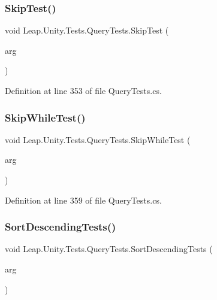 \subsubsection{\texorpdfstring{SkipTest()}{SkipTest()}}
{\footnotesize\ttfamily void Leap.\+Unity.\+Tests.\+Query\+Tests.\+Skip\+Test (\begin{DoxyParamCaption}\item[{\mbox{[}\+Value\+Source(\char`\"{}list0\char`\"{})\mbox{]} \mbox{\hyperlink{class_leap_1_1_unity_1_1_tests_1_1_query_tests_1_1_query_arg}{Query\+Arg}}}]{arg }\end{DoxyParamCaption})}



Definition at line 353 of file Query\+Tests.\+cs.

\mbox{\label{class_leap_1_1_unity_1_1_tests_1_1_query_tests_a1004cfd5e1d18bb4ff27c370eae01ec8}} 
\subsubsection{\texorpdfstring{SkipWhileTest()}{SkipWhileTest()}}
{\footnotesize\ttfamily void Leap.\+Unity.\+Tests.\+Query\+Tests.\+Skip\+While\+Test (\begin{DoxyParamCaption}\item[{\mbox{[}\+Value\+Source(\char`\"{}list0\char`\"{})\mbox{]} \mbox{\hyperlink{class_leap_1_1_unity_1_1_tests_1_1_query_tests_1_1_query_arg}{Query\+Arg}}}]{arg }\end{DoxyParamCaption})}



Definition at line 359 of file Query\+Tests.\+cs.

\mbox{\label{class_leap_1_1_unity_1_1_tests_1_1_query_tests_a4aee7357957aabbb0585cafeff7df189}} 
\subsubsection{\texorpdfstring{SortDescendingTests()}{SortDescendingTests()}}
{\footnotesize\ttfamily void Leap.\+Unity.\+Tests.\+Query\+Tests.\+Sort\+Descending\+Tests (\begin{DoxyParamCaption}\item[{\mbox{[}\+Value\+Source(\char`\"{}list0\char`\"{})\mbox{]} \mbox{\hyperlink{class_leap_1_1_unity_1_1_tests_1_1_query_tests_1_1_query_arg}{Query\+Arg}}}]{arg }\end{DoxyParamCaption})}



